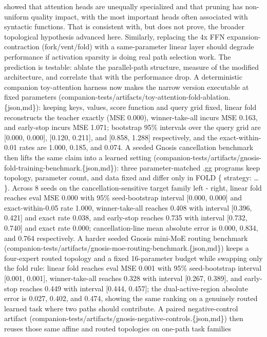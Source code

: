 \documentclass[
]{article}
\begin{document}
showed that attention heads are unequally specialized and that pruning
has non-uniform quality impact, with the most important heads often
associated with syntactic functions. That is consistent with, but does
not prove, the broader topological hypothesis advanced here. Similarly,
replacing the 4x FFN expansion-contraction (fork/vent/fold) with a
same-parameter linear layer should degrade performance if activation
sparsity is doing real path selection work. The prediction is testable:
ablate the parallel-path structure, measure of the modified
architecture, and correlate that with the performance drop. A
deterministic companion toy-attention harness now makes the narrow
version executable at fixed parameters
(companion-tests/artifacts/toy-attention-fold-ablation.\{json,md\}):
keeping keys, values, score function and query grid fixed, linear fold
reconstructs the teacher exactly (MSE 0.000), winner-take-all incurs MSE
0.163, and early-stop incurs MSE 1.071; bootstrap 95\% intervals over
the query grid are {[}0.000, 0.000{]}, {[}0.120, 0.211{]}, and {[}0.858,
1.288{]} respectively, and the exact-within-0.01 rates are 1.000, 0.185,
and 0.074. A seeded Gnosis cancellation benchmark then lifts the same
claim into a learned setting
(companion-tests/artifacts/gnosis-fold-training-benchmark.\{json,md\}):
three parameter-matched .gg programs keep topology, parameter count, and
data fixed and differ only in FOLD \{ strategy: \ldots{} \}. Across 8
seeds on the cancellation-sensitive target family left - right, linear
fold reaches eval MSE 0.000 with 95\% seed-bootstrap interval {[}0.000,
0.000{]} and exact-within-0.05 rate 1.000, winner-take-all reaches 0.408
with interval {[}0.396, 0.421{]} and exact rate 0.038, and early-stop
reaches 0.735 with interval {[}0.732, 0.740{]} and exact rate 0.000;
cancellation-line mean absolute error is 0.000, 0.834, and 0.764
respectively. A harder seeded Gnosis mini-MoE routing benchmark
(companion-tests/artifacts/gnosis-moe-routing-benchmark.\{json,md\})
keeps a four-expert routed topology and a fixed 16-parameter budget
while swapping only the fold rule: linear fold reaches eval MSE 0.001
with 95\% seed-bootstrap interval {[}0.001, 0.001{]}, winner-take-all
reaches 0.328 with interval {[}0.267, 0.389{]}, and early-stop reaches
0.449 with interval {[}0.444, 0.457{]}; the dual-active-region absolute
error is 0.027, 0.402, and 0.474, showing the same ranking on a
genuinely routed learned task where two paths should contribute. A
paired negative-control artifact
(companion-tests/artifacts/gnosis-negative-controls.\{json,md\}) then
reuses those same affine and routed topologies on one-path task families
\end{document}
